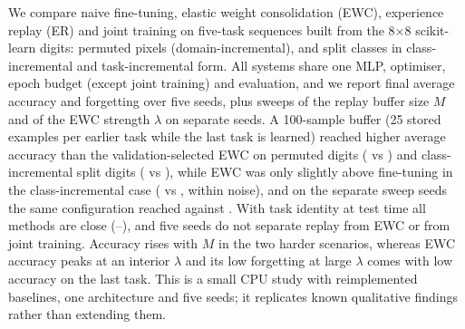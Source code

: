 We compare naive fine-tuning, elastic weight consolidation (EWC), experience replay (ER) and joint training on five-task sequences built from the 8$\times$8 scikit-learn digits: permuted pixels (domain-incremental), and split classes in class-incremental and task-incremental form. All systems share one MLP, optimiser, epoch budget (except joint training) and evaluation, and we report final average accuracy and forgetting over five seeds, plus sweeps of the replay buffer size $M$ and of the EWC strength $\lambda$ on separate seeds. A 100-sample buffer (25 stored examples per earlier task while the last task is learned) reached higher average accuracy than the validation-selected EWC on permuted digits ( vs ) and class-incremental split digits ( vs ), while EWC was only slightly above fine-tuning in the class-incremental case ( vs , within noise), and on the separate sweep seeds the same configuration reached  against . With task identity at test time all methods are close (--), and five seeds do not separate replay from EWC or from joint training. Accuracy rises with $M$ in the two harder scenarios, whereas EWC accuracy peaks at an interior $\lambda$ and its low forgetting at large $\lambda$ comes with low accuracy on the last task. This is a small CPU study with reimplemented baselines, one architecture and five seeds; it replicates known qualitative findings rather than extending them.
